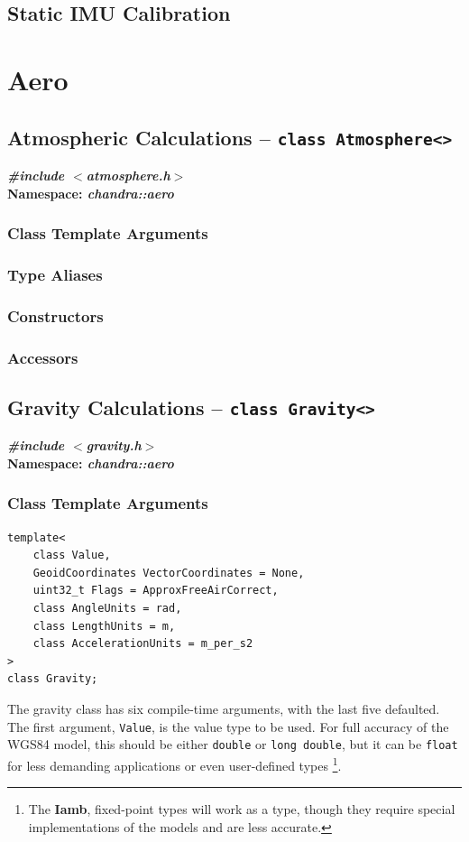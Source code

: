 \documentclass[10pt,letterpaper]{memoir} %
\newcommand{\apiheader}[2]{\noindent{}\textbf{\emph{\#include $<$#1$>$}}\\\noindent{}\textbf{Namespace: \emph{#2}}}
\begin{document}
\section{Static IMU Calibration}

\chapter{Aero}
\section{Atmospheric Calculations -- \texttt{class Atmosphere<>}}
\label{sec:atmosphere:calculation:api}
\apiheader{atmosphere.h}{chandra::aero}
\subsection{Class Template Arguments}
\subsection{Type Aliases}
\subsection{Constructors}
\subsection{Accessors}

\section{Gravity Calculations -- \texttt{class Gravity<>}}
\label{sec:gravity:calculation:api}
\apiheader{gravity.h}{chandra::aero}
\subsection{Class Template Arguments}
\begin{verbatim}
template<
	class Value,
	GeoidCoordinates VectorCoordinates = None,
	uint32_t Flags = ApproxFreeAirCorrect,
	class AngleUnits = rad,
	class LengthUnits = m,
	class AccelerationUnits = m_per_s2
>
class Gravity;	
\end{verbatim}
The gravity class has six compile-time arguments, with the last five defaulted.  The first argument, \texttt{Value}, is the value type to be used.  For full accuracy of the WGS84 model, this should be either \texttt{double} or \texttt{long double}, but it can be \texttt{float} for less demanding applications or even user-defined types \footnote{The \textbf{Iamb}, fixed-point types will work as a type, though they require special implementations of the models and are less accurate.}.  
\end{document}
